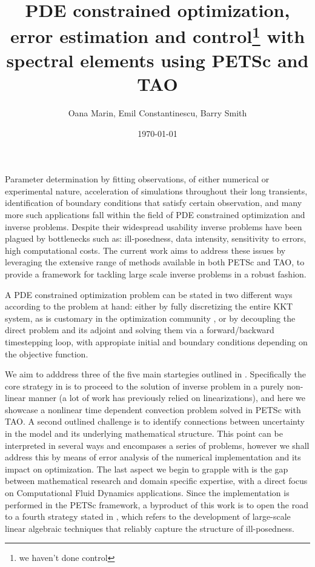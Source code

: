 \documentclass[10pt]{article}
\begin{document}

\title{PDE constrained optimization, error estimation and control\footnote{we haven't done control} with spectral elements using PETSc and TAO}
\vspace{1cm}
\author{Oana Marin, Emil Constantinescu, Barry Smith}
\date{\today}
\maketitle

Parameter determination by fitting observations, of either numerical or experimental nature, acceleration of simulations throughout their long transients, identification of boundary conditions that satisfy certain observation, and many more such applications fall within the field of PDE constrained optimization and inverse problems. Despite their widespread usability inverse problems have been plagued by bottlenecks such as: ill-posedness, data intensity, sensitivity to errors, high computational costs. The current work aims to address these issues by leveraging the extensive range of methods available in both PETSc and TAO, to provide a framework for tackling large scale inverse problems in a robust fashion.


A PDE constrained optimization problem can be stated in two different ways according to the problem at hand: either by fully discretizing the entire KKT system, as is customary in the optimization community \cite{Haber_2007}, or by decoupling the direct problem and its adjoint and solving them via a forward/backward timestepping loop, with appropiate initial and boundary conditions depending on the objective function.

We aim to adddress three of the five main startegies outlined in \cite{Brown_2008}. Specifically the core strategy in \cite{Brown_2008} is to proceed to the solution of inverse problem in a purely non-linear manner (a lot of work has previously relied on linearizations), and here we showcase a nonlinear time dependent convection problem solved in PETSc with TAO. A second outlined challenge is to identify connections between uncertainty in the model and its underlying mathematical structure. This point can be interpreted in several ways and encompases a series of problems, however we shall address this by means of error analysis of the numerical implementation and its impact on optimization. The last aspect we begin to grapple with is the gap between mathematical research and domain specific expertise, with a direct focus on Computational Fluid Dynamics applications. Since the implementation is performed in the PETSc framework, a byproduct of this work is to open the road to a fourth strategy stated in \cite{Brown_2008}, which refers to the development of large-scale linear algebraic techniques that reliably capture the structure of ill-posedness. 
\end{document}
